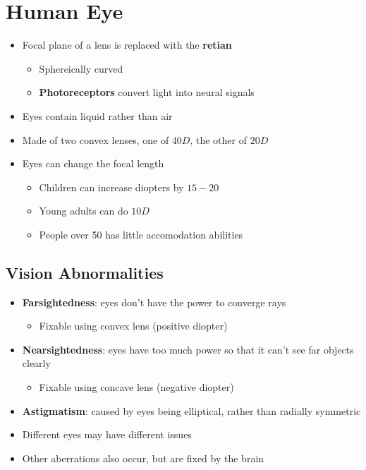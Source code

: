 \section{Human Eye}

\begin{itemize}
  \item Focal plane of a lens is replaced with the \textbf{retian}
  \begin{itemize}
    \item Sphereically curved
    \item \textbf{Photoreceptors} convert light into neural signals
  \end{itemize}

  \item Eyes contain liquid rather than air
  \item Made of two convex lenses, one of $ 40 D $, the other of $ 20 D $
  \item Eyes can change the focal length
  \begin{itemize}
    \item Children can increase diopters by $ 15-20 $
    \item Young adults can do $ 10 D $
    \item People over 50 has little accomodation abilities
  \end{itemize}
\end{itemize}

\subsection{Vision Abnormalities}

  \begin{itemize}
    \item \textbf{Farsightedness}: eyes don't have the power to converge rays
    \begin{itemize}
      \item Fixable using convex lens (positive diopter)
    \end{itemize}

    \item \textbf{Nearsightedness}: eyes have too much power so that it can't
    see far objects clearly
    \begin{itemize}
      \item Fixable using concave lens (negative diopter)
    \end{itemize}

    \item \textbf{Astigmatism}: caused by eyes being elliptical, rather than
    radially symmetric

    \item Different eyes may have different issues
    \item Other aberrations also occur, but are fixed by the brain
  \end{itemize}

